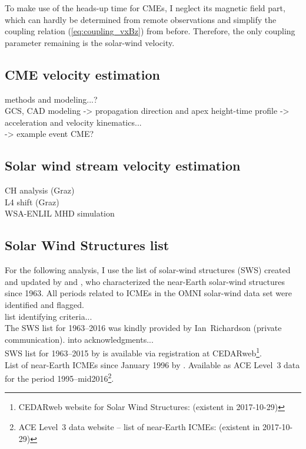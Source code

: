To make use of the heads-up time for CMEs, I neglect its magnetic field part, which can hardly be determined from remote observations and simplify the coupling relation (\ref{eq:coupling_vxBz}) from before. Therefore, the only coupling parameter remaining is the solar-wind velocity.

\subsection{CME velocity estimation}
methods and modeling...?\\
GCS, CAD modeling -> propagation direction and apex height-time profile -> acceleration and velocity kinematics...\\
-> example event CME?\\

\subsection{Solar wind stream velocity estimation}
CH analysis (Graz)\\
L4 shift (Graz)\\
WSA-ENLIL MHD simulation\\

\subsection{Solar Wind Structures list}
For the following analysis, I use the list of solar-wind structures (SWS) created and updated by \citet{Richardson2000} and \citet{Richardson2012}, who characterized the near-Earth solar-wind structures since 1963. All periods related to ICMEs in the OMNI solar-wind data set were identified and flagged.\\

list identifying criteria...\\

The SWS list for 1963--2016 was kindly provided by Ian~Richardson (private communication). into acknowledgments...\\

SWS list for 1963--2015 by \citep{Richardson2000,Richardson2012} is available via registration at CEDARweb\footnote{CEDARweb website for Solar Wind Structures:  (existent in 2017-10-29)}.\\
List of near-Earth ICMEs since January 1996 by \citet{Cane2003,Richardson2010}. Available as ACE Level~3 data for the period 1995--mid2016\footnote{ACE Level~3 data website -- list of near-Earth ICMEs:  (existent in 2017-10-29)}.\\

